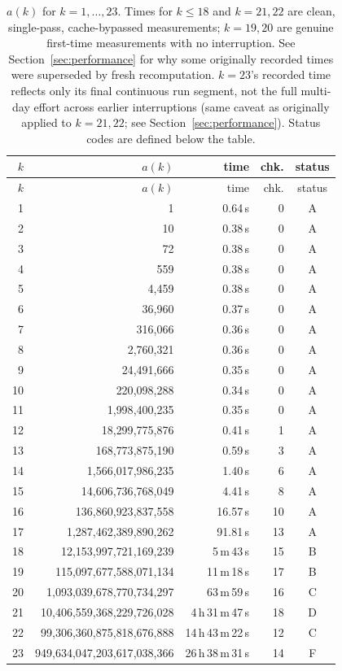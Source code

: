 \documentclass[11pt]{amsart}
\begin{document}
{\footnotesize
\begin{longtable}{@{} r r r r c @{}}
\caption{$a(k)$ for $k=1,\dots,23$. Times for $k \leq 18$ and $k=21,22$
are clean, single-pass, cache-bypassed measurements; $k=19,20$ are
genuine first-time measurements with no interruption. See
Section~\ref{sec:performance} for why some originally recorded times
were superseded by fresh recomputation. $k=23$'s recorded time reflects
only its final continuous run segment, not the full multi-day effort
across earlier interruptions (same caveat as originally applied to
$k=21,22$; see Section~\ref{sec:performance}). Status codes are defined
below the table.}
\label{tab:results} \\
\toprule
$k$ & $a(k)$ & time & chk. & status \\
\midrule
\endfirsthead
\toprule
$k$ & $a(k)$ & time & chk. & status \\
\midrule
\endhead
1  & 1 & 0.64\,s & 0 & A \\
2  & 10 & 0.38\,s & 0 & A \\
3  & 72 & 0.38\,s & 0 & A \\
4  & 559 & 0.38\,s & 0 & A \\
5  & 4{,}459 & 0.38\,s & 0 & A \\
6  & 36{,}960 & 0.37\,s & 0 & A \\
7  & 316{,}066 & 0.36\,s & 0 & A \\
8  & 2{,}760{,}321 & 0.36\,s & 0 & A \\
9  & 24{,}491{,}666 & 0.35\,s & 0 & A \\
10 & 220{,}098{,}288 & 0.34\,s & 0 & A \\
11 & 1{,}998{,}400{,}235 & 0.35\,s & 0 & A \\
12 & 18{,}299{,}775{,}876 & 0.41\,s & 1 & A \\
13 & 168{,}773{,}875{,}190 & 0.59\,s & 3 & A \\
14 & 1{,}566{,}017{,}986{,}235 & 1.40\,s & 6 & A \\
15 & 14{,}606{,}736{,}768{,}049 & 4.41\,s & 8 & A \\
16 & 136{,}860{,}923{,}837{,}558 & 16.57\,s & 10 & A \\
17 & 1{,}287{,}462{,}389{,}890{,}262 & 91.81\,s & 13 & A \\
18 & 12{,}153{,}997{,}721{,}169{,}239 & 5\,m\,43\,s & 15 & B \\
19 & 115{,}097{,}677{,}588{,}071{,}134 & 11\,m\,18\,s & 17 & B \\
20 & 1{,}093{,}039{,}678{,}770{,}734{,}297 & 63\,m\,59\,s & 16 & C \\
21 & 10{,}406{,}559{,}368{,}229{,}726{,}028 & 4\,h\,31\,m\,47\,s & 18 & D \\
22 & 99{,}306{,}360{,}875{,}818{,}676{,}888 & 14\,h\,43\,m\,22\,s & 12 & C \\
23 & 949{,}634{,}047{,}203{,}617{,}038{,}366 & 26\,h\,38\,m\,31\,s\rlap{$^{\dagger}$} & 14 & F \\
\bottomrule
\end{longtable}
}
\end{document}

